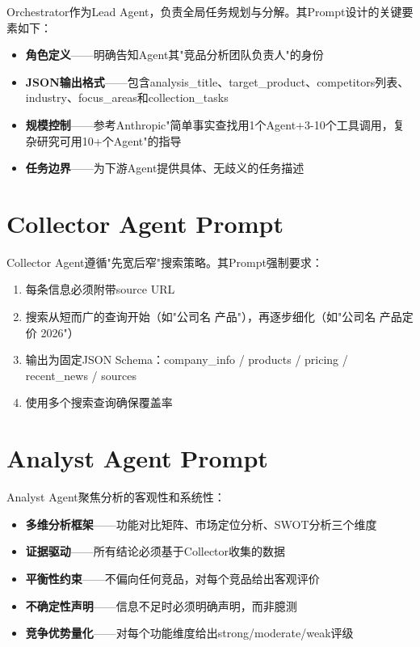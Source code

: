 \documentclass[12pt,a4paper]{ctexrep}
\begin{document}
Orchestrator作为Lead Agent，负责全局任务规划与分解。其Prompt设计的关键要素如下：

\begin{itemize}
\item \textbf{角色定义}——明确告知Agent其"竞品分析团队负责人"的身份
\item \textbf{JSON输出格式}——包含analysis\_title、target\_product、competitors列表、industry、focus\_areas和collection\_tasks
\item \textbf{规模控制}——参考Anthropic"简单事实查找用1个Agent+3-10个工具调用，复杂研究可用10+个Agent"的指导
\item \textbf{任务边界}——为下游Agent提供具体、无歧义的任务描述
\end{itemize}

\section{Collector Agent Prompt}

Collector Agent遵循"先宽后窄"搜索策略。其Prompt强制要求：

\begin{enumerate}
\item 每条信息必须附带source URL
\item 搜索从短而广的查询开始（如"公司名 产品"），再逐步细化（如"公司名 产品定价 2026"）
\item 输出为固定JSON Schema：company\_info / products / pricing / recent\_news / sources
\item 使用多个搜索查询确保覆盖率
\end{enumerate}

\section{Analyst Agent Prompt}

Analyst Agent聚焦分析的客观性和系统性：

\begin{itemize}
\item \textbf{多维分析框架}——功能对比矩阵、市场定位分析、SWOT分析三个维度
\item \textbf{证据驱动}——所有结论必须基于Collector收集的数据
\item \textbf{平衡性约束}——不偏向任何竞品，对每个竞品给出客观评价
\item \textbf{不确定性声明}——信息不足时必须明确声明，而非臆测
\item \textbf{竞争优势量化}——对每个功能维度给出strong/moderate/weak评级
\end{itemize}
\end{document}
